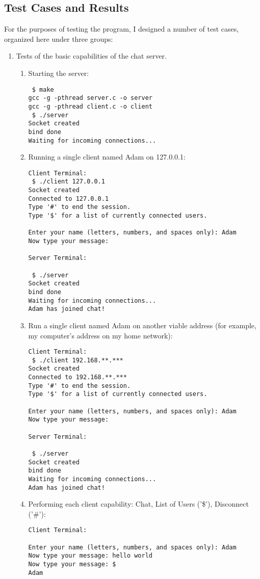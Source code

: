 \documentclass[titlepage, 14pt]{article}
\begin{document}
\subsection{Test Cases and Results}
For the purposes of testing the program, I designed a number of test cases, organized here under three groups:
\begin{enumerate}
\item Tests of the basic capabilities of the chat server. 
  \begin{enumerate}
    \item Starting the server: 
\begin{verbatim}
 $ make
gcc -g -pthread server.c -o server
gcc -g -pthread client.c -o client
 $ ./server
Socket created
bind done
Waiting for incoming connections...
\end{verbatim}
    \item Running a single client named Adam on 127.0.0.1:
\begin{verbatim}
Client Terminal:
 $ ./client 127.0.0.1
Socket created
Connected to 127.0.0.1
Type '#' to end the session.
Type '$' for a list of currently connected users.

Enter your name (letters, numbers, and spaces only): Adam
Now type your message: 

Server Terminal:

 $ ./server
Socket created
bind done
Waiting for incoming connections...
Adam has joined chat!
\end{verbatim}
    \item Run a single client named Adam on another viable address (for example, my computer's address on my home network):
\begin{verbatim}
Client Terminal:
 $ ./client 192.168.**.***
Socket created
Connected to 192.168.**.***
Type '#' to end the session.
Type '$' for a list of currently connected users.

Enter your name (letters, numbers, and spaces only): Adam
Now type your message: 

Server Terminal:

 $ ./server
Socket created
bind done
Waiting for incoming connections...
Adam has joined chat!
\end{verbatim}
    \item Performing each client capability: Chat, List of Users ('\$'), Disconnect ('\#'):
\begin{verbatim}
Client Terminal:

Enter your name (letters, numbers, and spaces only): Adam
Now type your message: hello world
Now type your message: $
Adam


\end{verbatim}
\end{enumerate}
\end{enumerate}
\end{document}
